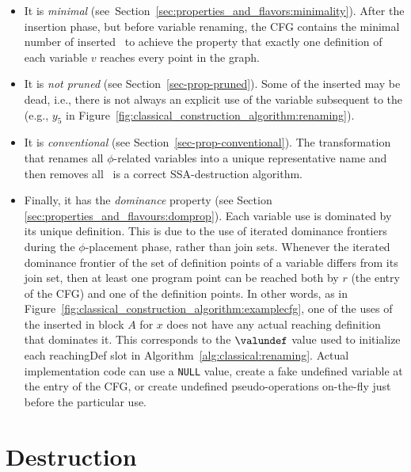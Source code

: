 {\begin{itemize}
\item It is \textit{minimal} (see~Section~\ref{sec:properties_and_flavors:minimality}). After the \phifun insertion phase, but before variable renaming, the CFG contains the minimal number of inserted \phifuns\ to achieve the property that exactly one definition of each variable $v$ reaches every point in the graph.
\item It is \textit{not pruned} (see Section~\ref{sec-prop-pruned}). Some of the inserted \phifuns may be dead, i.e., there is not always an explicit use of the variable subsequent to the \phifun (e.g., $y_5$ in Figure~\ref{fig:classical_construction_algorithm:renaming}).
\item It is \textit{conventional} (see Section~\ref{sec-prop-conventional}). The transformation that renames all $\phi$-related variables into a unique representative name and then removes all \phifuns\ is a correct SSA-destruction algorithm.
\item Finally, it has the \textit{dominance} property (see Section \ref{sec:properties_and_flavours:domprop}). Each variable use is dominated by its unique definition. 
  This is due to the use of iterated dominance frontiers during the $\phi$-placement phase, rather than join sets. 
  Whenever the iterated dominance frontier of the set of definition points of a variable differs from its join set, then at least one program point can be reached both by $r$ (the entry of the CFG) and one of the definition points. 
  In other words, as in Figure~\ref{fig:classical_construction_algorithm:examplecfg}, one of the uses of the \phifun inserted in block $A$ for $x$ does not have any actual reaching definition that dominates it. 
  This corresponds to the $\valundef$ value used to initialize each reachingDef slot in Algorithm~\ref{alg:classical:renaming}. 
  Actual implementation code can use a \texttt{NULL} value, create a fake undefined variable at the entry of the CFG, or create undefined pseudo-operations on-the-fly just before the particular use.
\end{itemize}


\section{Destruction}
\label{sec:classical_construction_algorithm:destruction}

}
